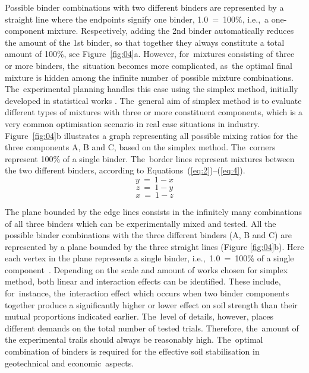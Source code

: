 \documentclass[materials,article,accept,pdftex,moreauthors]{Definitions/mdpi}
\begin{document}
Possible binder combinations with two different binders are represented by a straight line where the endpoints signify one binder, 1.0~=~100\%, i.e.,~a one-component mixture. Respectively, adding the {2}nd binder automatically reduces the amount of the {1}st binder, so that together they always constitute a total amount of 100\%, see Figure~\ref{fig:04}a. However, for~mixtures consisting of three or more binders, the~situation becomes more complicated, as~the optimal final mixture is hidden among the infinite number of possible mixture combinations. The~experimental planning handles this case using the simplex method, initially developed in statistical works \citep{Montgomery,MyersMontgomery}. The~general aim of simplex method is to evaluate different types of mixtures with three or more constituent components, which is a very common optimisation scenario in real case situations in industry. Figure~\ref{fig:04}b illustrates a graph representing all possible mixing ratios for the three components A, B and C, based on the simplex method. The~corners represent 100\% of a single binder. The~border lines represent mixtures between the two different binders, according to Equations~(\ref{eq:2})--(\ref{eq:4}).
\begin{equation}\label{eq:2}
y~=~1 - x	
\end{equation}
\begin{equation}\label{eq:3}
z~=~1 - y
\end{equation}
\begin{equation}\label{eq:4}
x~=~1 - z
\end{equation}

The plane bounded by the edge lines consists in the infinitely many combinations of all three binders which can be experimentally mixed and tested. All the possible binder combinations with the three different binders (A, B and C) are represented by a plane bounded by the three straight lines (Figure \ref{fig:04}b). Here each vertex in the plane represents a single binder, i.e.,~1.0~=~100\% of a single component~\cite{MyersMontgomery}. Depending on the scale and amount of works chosen for simplex method, both linear and interaction effects can be identified. These include, for~instance, the~interaction effect which occurs when two binder components together produce a significantly higher or lower effect on soil strength than their mutual proportions indicated earlier. The~level of details, however, places different demands on the total number of tested trials. Therefore, the~amount of the experimental trails should always be reasonably high. The~optimal combination of binders is required for the effective soil stabilisation in geotechnical and economic~aspects.
\end{document}
